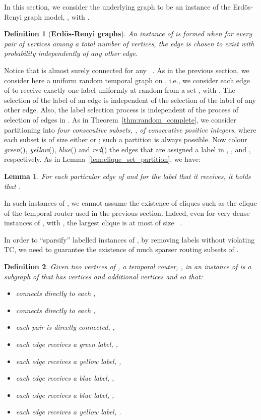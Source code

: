 \documentclass[a4paper,UKenglish]{article}
\newtheorem{definition}{Definition}
\newtheorem{lemma}{Lemma}
\begin{document}
In this section, we consider the underlying graph  to be an instance of the Erd\"os-Renyi graph model, , with .

\begin{definition}[\textbf{Erd\"{o}s-Renyi graphs}]
An instance of  is formed when for every pair of vertices  among a total number of  vertices, the edge  is chosen to exist with probability  independently of any other edge.
\end{definition}

Notice that  is almost surely connected for any ~\cite{bollobasb}. As in the previous section, we consider here a uniform random temporal graph on , i.e., we consider each edge of  to receive exactly one label uniformly at random from a set , with . The selection of the label of an edge is independent of the selection of the label of any other edge. Also, the label selection process is independent of the process of selection of edges in . As in Theorem~\ref{thm:random_complete}, we consider partitioning  into \emph{four consecutive subsets, , of consecutive positive integers}, where each subset is of size either  or ; such a partition is always possible. Now colour \emph{green}(), \emph{yellow}(), \emph{blue}() and \emph{red}() the edges that are assigned a label in , ,  and , respectively. As in Lemma~\ref{lem:clique_set_partition}, we have:
\begin{lemma}
For each particular edge of  and for the label  that it receives, it holds that .
\end{lemma}

In such instances of , we cannot assume the existence of cliques such as the clique of the temporal router used in the previous section. Indeed, even for very dense instances of , with , the largest clique is at most of size ~\cite{bollobasb}.

In order to ``sparsify'' labelled instances  of , by removing labels without violating TC, we need to guarantee the existence of much sparser routing subsets of .

\begin{definition}
Given two vertices  of , a \emph{temporal router, , in an instance  of } is a subgraph of  that has vertices  and additional vertices  and  so that:
\begin{itemize}
\item  connects directly to each ,
\item  connects directly to each ,
\item each pair  is directly connected, ,
\item each edge  receives a green label, ,
\item each edge  receives a yellow label, ,
\item each edge  receives a blue label, ,
\item each edge  receives a blue label, ,
\item each edge  receives a yellow label, .
\end{itemize}
\end{definition}
\end{document}
